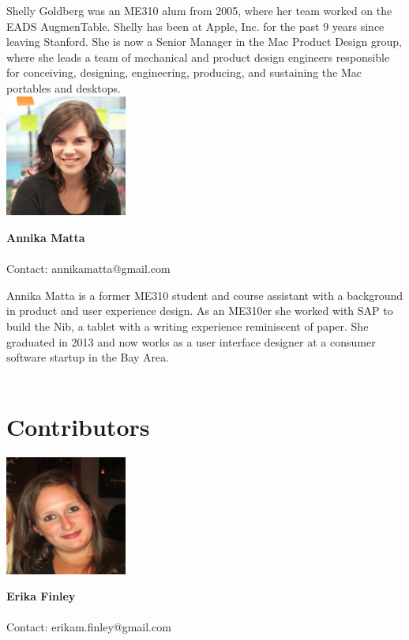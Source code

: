 Shelly Goldberg was an ME310 alum from 2005, where her team worked on the EADS AugmenTable.  Shelly has been at Apple, Inc. for the past 9 years since leaving Stanford.  She is now a Senior Manager in the Mac Product Design group, where she leads a team of mechanical and product design engineers responsible for conceiving, designing, engineering, producing, and sustaining the Mac portables and desktops.  
\\

\noindent \includegraphics[width=40mm]{images/annika.jpg}
\parbox[b]{0.6\textwidth}{\textbf{Annika Matta}\\ \\
Contact: annikamatta@gmail.com  \\
}

Annika Matta is a former ME310 student and course assistant with a background in product and user experience design. As an ME310er she worked with SAP to build the Nib, a tablet with a writing experience reminiscent of paper. She graduated in 2013 and now works as a user interface designer at a consumer software startup in the Bay Area.
\\ \\


\section{Contributors}

\noindent \includegraphics[width=40mm]{images/image012.jpg}
\parbox[b]{0.6\textwidth}{\textbf{Erika Finley}\\ \\
Contact: erikam.finley@gmail.com  \\
}

